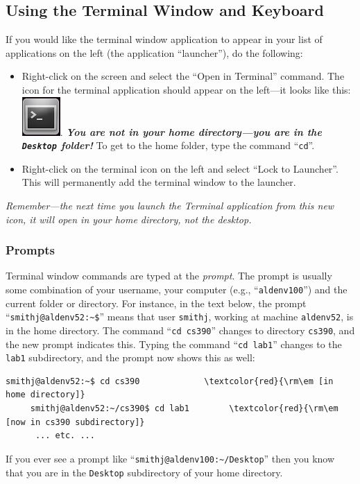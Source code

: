 \subsection*{Using the Terminal Window and Keyboard}
\vspace{-0.1in}
If you would like the terminal window application to appear in your list
of applications on the left (the application ``launcher''), do the following:
\begin{itemize}
\item
Right-click on the screen and select the ``Open in Terminal'' command.
The icon for the terminal application should appear on the left---it
looks like this: \includegraphics[width=.4in]{images/terminal}. 
\textbf{\textit{You are not in your home directory---you are in the 
{\tt Desktop} folder!}} To get to the home folder, type the command ``{\tt cd}''.
\item
Right-click on the terminal icon on the left and select ``Lock to
Launcher''. This will permanently add the terminal window to the launcher.
\end{itemize}

{\em Remember---the next time you launch the Terminal application from
this new icon, it will open in your home directory, not the desktop.}

\subsubsection*{Prompts}
\vspace{-0.1in}
Terminal window commands are typed at 
the {\em prompt}. The prompt is usually some 
combination of your username, your computer (e.g., ``{\tt aldenv100}'')
and the current folder or directory. For instance, in the text below, 
the prompt ``\verb#smithj@aldenv52:~$#'' means that user {\tt smithj},
working at machine {\tt aldenv52}, is in the home directory.
The command ``{\tt cd cs390}'' changes to directory
{\tt cs390}, and the new prompt indicates this. Typing the command 
``{\tt cd lab1}'' changes to the {\tt lab1} subdirectory, and the prompt now
shows this as well:
\begin{Verbatim}[commandchars=\\\{\}]
     smithj@aldenv52:~$ cd cs390             \textcolor{red}{\rm\em [in home directory]}
     smithj@aldenv52:~/cs390$ cd lab1        \textcolor{red}{\rm\em [now in cs390 subdirectory]}
      ... etc. ...
\end{Verbatim}
If you ever see a prompt like ``\verb$smithj@aldenv100:~/Desktop$'' then you
know that you are in the {\tt Desktop} subdirectory of your home directory.

